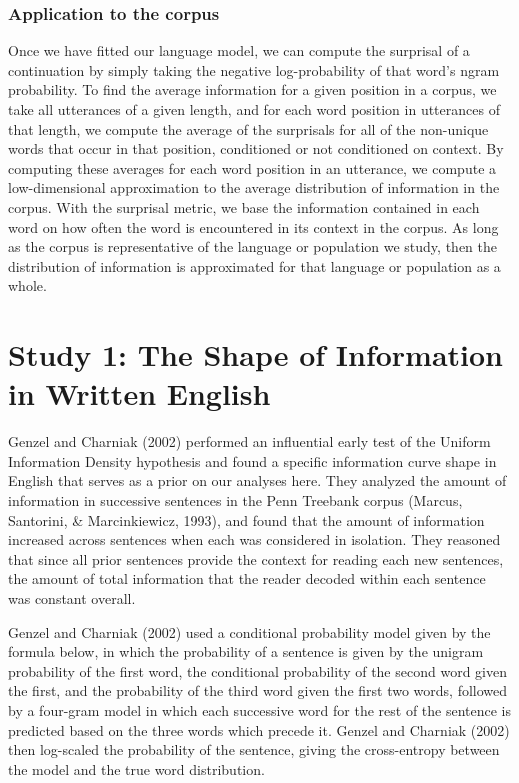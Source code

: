 \documentclass[
  english,
  man,floatsintext]{apa6}
\begin{document}
\hypertarget{application-to-the-corpus}{%
\subsubsection{Application to the corpus}\label{application-to-the-corpus}}

Once we have fitted our language model, we can compute the surprisal of a continuation by simply taking the negative log-probability of that word's ngram probability. To find the average information for a given position in a corpus, we take all utterances of a given length, and for each word position in utterances of that length, we compute the average of the surprisals for all of the non-unique words that occur in that position, conditioned or not conditioned on context. By computing these averages for each word position in an utterance, we compute a low-dimensional approximation to the average distribution of information in the corpus. With the surprisal metric, we base the information contained in each word on how often the word is encountered in its context in the corpus. As long as the corpus is representative of the language or population we study, then the distribution of information is approximated for that language or population as a whole.

\hypertarget{study-1-the-shape-of-information-in-written-english}{%
\section{Study 1: The Shape of Information in Written English}\label{study-1-the-shape-of-information-in-written-english}}

Genzel and Charniak (2002) performed an influential early test of the Uniform Information Density hypothesis and found a specific information curve shape in English that serves as a prior on our analyses here. They analyzed the amount of information in successive sentences in the Penn Treebank corpus (Marcus, Santorini, \& Marcinkiewicz, 1993), and found that the amount of information increased across sentences when each was considered in isolation. They reasoned that since all prior sentences provide the context for reading each new sentences, the amount of total information that the reader decoded within each sentence was constant overall.

Genzel and Charniak (2002) used a conditional probability model given by the formula below, in which the probability of a sentence is given by the unigram probability of the first word, the conditional probability of the second word given the first, and the probability of the third word given the first two words, followed by a four-gram model in which each successive word for the rest of the sentence is predicted based on the three words which precede it. Genzel and Charniak (2002) then log-scaled the probability of the sentence, giving the cross-entropy between the model and the true word distribution.
\end{document}

